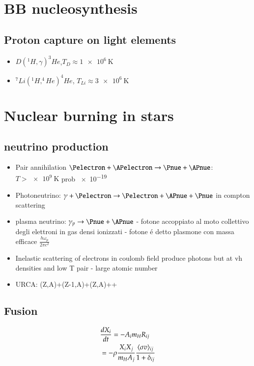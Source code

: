 \documentclass[main.tex]{subfiles}
\begin{document}
\chapter{BB nucleosynthesis}
\PartialToc

\section{Proton capture on light elements}

\begin{itemize}
\item $D(^1H,\gamma)^3He$,$T_D\approx \SI{1e6}{\kelvin}$
\item $^7Li(^1H,^4He)^4He$, $T_{Li}\approx\SI{3e6}{\kelvin}$ 

\end{itemize}

\chapter{Nuclear burning in stars}
\PartialToc

\section{neutrino production}
\begin{itemize}
\item  Pair annihilation $\Pelectron+\APelectron\to\Pnue+\APnue$: $T>\SI{e9}{\kelvin}$ prob \num{e-19}
\item Photoneutrino: $\gamma+\Pelectron\to\Pelectron+\APnue+\Pnue$ in compton scattering
\item plasma neutrino: $\gamma_p\to\Pnue+\APnue$ - fotone accoppiato al moto collettivo degli elettroni in gas densi ionizzati - fotone \'e detto plasmone con massa efficace $\frac{h\omega_p}{2\pi c^2}$
\item Inelastic scattering of electrons in coulomb field produce photons but at vh densities and low T \Pnue\APnue pair - large atomic number
\item URCA: (Z,A)+\Pelectron\to(Z-1,A)+\Pnue\to(Z,A)+\Pelectron+\APelectron
\end{itemize}
\section{Fusion}
\begin{align*}
&\TDy{t}{X_i}=-A_im_HR_{ij}\\
&=-\rho\frac{X_iX_j}{m_HA_j}\frac{\exv{\sigma v}_{ij}}{1+\delta_{ij}}
\end{align*} 
\end{document}

